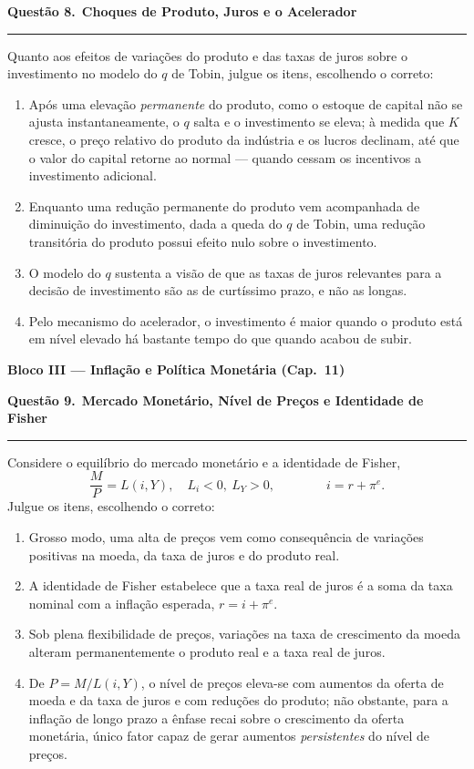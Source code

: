 \documentclass[12pt, a4paper]{article}
\newcommand{\provaquestao}[2]{%
  \par\vspace{0.9em}%
  {\large\bfseries\color{cyanrbc} Questão #1.}\ {\bfseries #2}\par
  \vspace{-0.45em}\rule{\linewidth}{0.4pt}\par\vspace{0.1em}}
\begin{document}
\provaquestao{8}{Choques de Produto, Juros e o Acelerador}

Quanto aos efeitos de variações do produto e das taxas de juros sobre o
investimento no modelo do $q$ de Tobin, julgue os itens, escolhendo o correto:

\begin{enumerate}[label=\alph*)]
\item Após uma elevação \emph{permanente} do produto, como o estoque de capital
não se ajusta instantaneamente, o $q$ salta e o investimento se eleva; à medida
que $K$ cresce, o preço relativo do produto da indústria e os lucros declinam,
até que o valor do capital retorne ao normal --- quando cessam os incentivos a
investimento adicional.
\item Enquanto uma redução permanente do produto vem acompanhada de diminuição
do investimento, dada a queda do $q$ de Tobin, uma redução transitória do
produto possui efeito nulo sobre o investimento.
\item O modelo do $q$ sustenta a visão de que as taxas de juros relevantes para
a decisão de investimento são as de curtíssimo prazo, e não as longas.
\item Pelo mecanismo do acelerador, o investimento é maior quando o produto
está em nível elevado há bastante tempo do que quando acabou de subir.
\end{enumerate}

\begin{center}
{\large\bfseries\color{cyanrbc} Bloco III --- Inflação e Política Monetária (Cap.\ 11)}
\end{center}

\provaquestao{9}{Mercado Monetário, Nível de Preços e Identidade de Fisher}

Considere o equilíbrio do mercado monetário e a identidade de Fisher,
\[
\frac{M}{P} = L(i, Y), \quad L_i < 0,\ L_Y > 0,
\qquad\qquad
i = r + \pi^e.
\]
Julgue os itens, escolhendo o correto:

\begin{enumerate}[label=\alph*)]
\item Grosso modo, uma alta de preços vem como consequência de variações
positivas na moeda, da taxa de juros e do produto real.
\item A identidade de Fisher estabelece que a taxa real de juros é a soma da
taxa nominal com a inflação esperada, $r = i + \pi^e$.
\item Sob plena flexibilidade de preços, variações na taxa de crescimento da
moeda alteram permanentemente o produto real e a taxa real de juros.
\item De $P = M/L(i,Y)$, o nível de preços eleva-se com aumentos da oferta de
moeda e da taxa de juros e com reduções do produto; não obstante, para a
inflação de longo prazo a ênfase recai sobre o crescimento da oferta monetária,
único fator capaz de gerar aumentos \emph{persistentes} do nível de preços.
\end{enumerate}
\end{document}
